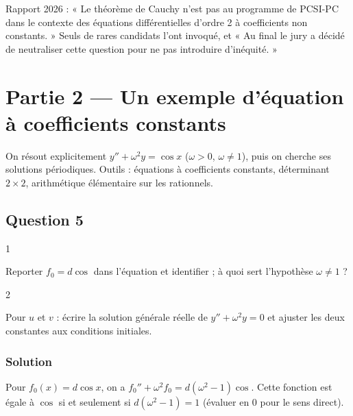 \documentclass[11pt,a4paper]{article}
\begin{document}
\begin{jury}

Rapport 2026 : « Le théorème de Cauchy n'est pas au programme de PCSI-PC dans le contexte des équations différentielles d'ordre 2 à coefficients non constants. » Seuls de rares candidats l'ont invoqué, et « Au final le jury a décidé de neutraliser cette question pour ne pas introduire d'inéquité. »

\end{jury}

\hypertarget{partie-2-un-exemple-duxe9quation-uxe0-coefficients-constants}{%
\section{Partie 2 --- Un exemple d'équation à coefficients constants}\label{partie-2-un-exemple-duxe9quation-uxe0-coefficients-constants}}

On résout explicitement \(y''+\omega^2y=\cos x\) (\(\omega>0\), \(\omega\neq1\)), puis on cherche ses solutions périodiques. Outils : équations à coefficients constants, déterminant \(2\times2\), arithmétique élémentaire sur les rationnels.

\hypertarget{question-5}{%
\subsection{Question 5}\label{question-5}}

\begin{indication}{1}

Reporter \(f_0=d\cos\) dans l'équation et identifier ; à quoi sert l'hypothèse \(\omega\neq1\) ?

\end{indication}

\begin{indication}{2}

Pour \(u\) et \(v\) : écrire la solution générale réelle de \(y''+\omega^2y=0\) et ajuster les deux constantes aux conditions initiales.

\end{indication}

\hypertarget{solution-4}{%
\subsubsection{Solution}\label{solution-4}}

Pour \(f_0(x)=d\cos x\), on a \(f_0''+\omega^2f_0=d(\omega^2-1)\cos\). Cette fonction est égale à \(\cos\) si et seulement si \(d(\omega^2-1)=1\) (évaluer en \(0\) pour le sens direct).
\end{document}
